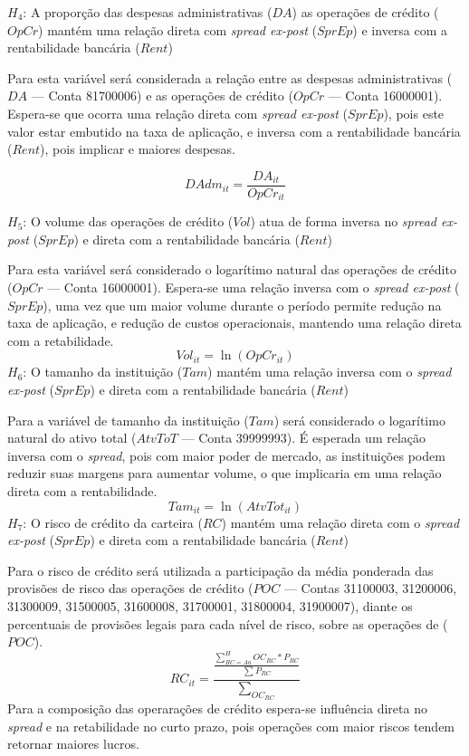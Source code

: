 \documentclass[12pt,12pt,openright,oneside,a4paper,chapter=TITLE,section=TITLE,subsection=TITLE,subsubsection=TITLE english,french,spanish,portugues,sumario=tradicional]{abntex2}
\begin{document}
\(H_4\): A proporção das despesas administrativas (\(DA\)) as operações de crédito (\(OpCr\)) mantém uma relação direta com \emph{spread ex-post} (\(SprEp\)) e inversa com a rentabilidade bancária (\(Rent\))

Para esta variável será considerada a relação entre as despesas administrativas (\(DA\) --- Conta 81700006) e as operações de crédito (\(OpCr\) --- Conta 16000001). Espera-se que ocorra uma relação direta com \emph{spread ex-post} (\(SprEp\)), pois este valor estar embutido na taxa de aplicação, e inversa com a rentabilidade bancária (\(Rent\)), pois implicar e maiores despesas.

\[
DAdm_{it} = \frac{DA_{it}}{OpCr_{it}}
\]

\(H_5\): O volume das operações de crédito (\(Vol\)) atua de forma inversa no \emph{spread ex-post} (\(SprEp\)) e direta com a rentabilidade bancária (\(Rent\))

Para esta variável será considerado o logarítimo natural das operações de crédito (\(OpCr\) --- Conta 16000001). Espera-se uma relação inversa com o \emph{spread ex-post} (\(SprEp\)), uma vez que um maior volume durante o período permite redução na taxa de aplicação, e redução de custos operacionais, mantendo uma relação direta com a retabilidade.
\[
Vol_{it} = \ln(OpCr_{it})
\]
\(H_6\): O tamanho da instituição (\(Tam\)) mantém uma relação inversa com o \emph{spread ex-post} (\(SprEp\)) e direta com a rentabilidade bancária (\(Rent\))

Para a variável de tamanho da instituição (\(Tam\)) será considerado o logarítimo natural do ativo total (\(AtvToT\) --- Conta 39999993). É esperada um relação inversa com o \emph{spread}, pois com maior poder de mercado, as instituições podem reduzir suas margens para aumentar volume, o que implicaria em uma relação direta com a rentabilidade.
\[
Tam_{it} = \ln(AtvTot_{it})
\]
\(H_7\): O risco de crédito da carteira (\(RC\)) mantém uma relação direta com o \emph{spread ex-post} (\(SprEp\)) e direta com a rentabilidade bancária (\(Rent\))

Para o risco de crédito será utilizada a participação da média ponderada das provisões de risco das operações de crédito (\(POC\) --- Contas 31100003, 31200006, 31300009, 31500005, 31600008, 31700001, 31800004, 31900007), diante os percentuais de provisões legais para cada nível de risco, sobre as operações de (\(POC\)).
\[
RC_{it} = \frac{\frac{\sum_{RC = Aa}^HOC_{RC}*P_{RC}}{\sum_{}P_{RC}}}{\sum_{OC_{RC}}}
\]
Para a composição das operarações de crédito espera-se influência direta no \emph{spread} e na retabilidade no curto prazo, pois operações com maior riscos tendem retornar maiores lucros.
\end{document}
